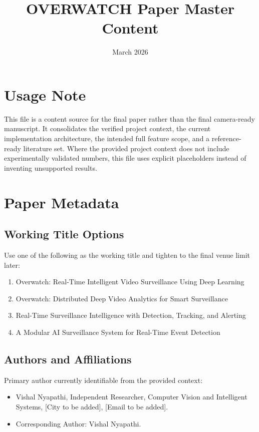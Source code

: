 \documentclass[11pt]{article}
\title{OVERWATCH Paper Master Content}
\author{}
\date{March 2026}
\begin{document}
\maketitle

\section*{Usage Note}
This file is a content source for the final paper rather than the final camera-ready manuscript. It consolidates the verified project context, the current implementation architecture, the intended full feature scope, and a reference-ready literature set. Where the provided project context does not include experimentally validated numbers, this file uses explicit placeholders instead of inventing unsupported results.

\section{Paper Metadata}

\subsection{Working Title Options}
Use one of the following as the working title and tighten to the final venue limit later:

\begin{enumerate}
\item Overwatch: Real-Time Intelligent Video Surveillance Using Deep Learning
\item Overwatch: Distributed Deep Video Analytics for Smart Surveillance
\item Real-Time Surveillance Intelligence with Detection, Tracking, and Alerting
\item A Modular AI Surveillance System for Real-Time Event Detection
\end{enumerate}

\subsection{Authors and Affiliations}
Primary author currently identifiable from the provided context:

\begin{itemize}
\item Vishal Nyapathi, Independent Researcher, Computer Vision and Intelligent Systems, [City to be added], [Email to be added].
\item Corresponding Author: Vishal Nyapathi.
\end{itemize}
\end{document}

